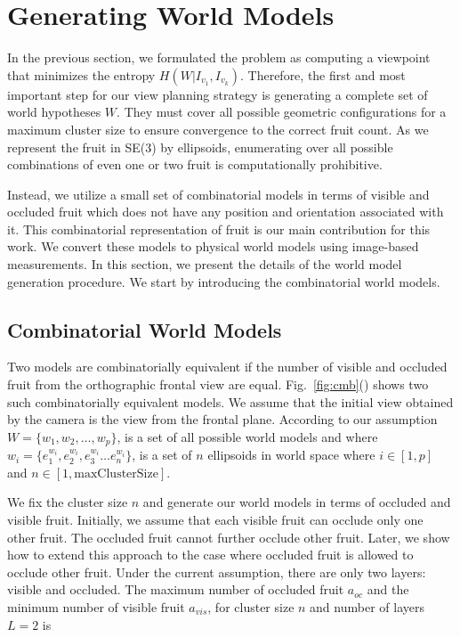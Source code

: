 \section{Generating World Models}\label{sec:models}
In the previous section, we formulated the problem as computing a viewpoint that minimizes the entropy $H(W|I_{v_1},I_{v_k})$. Therefore, the first and most important step for our view planning strategy is generating a complete set of world hypotheses $W$. They must cover all possible geometric configurations for a maximum cluster size to ensure convergence to the correct fruit count. As we represent the fruit in SE(3) by ellipsoids, enumerating over all possible combinations of even one or two fruit is computationally prohibitive.  

Instead, we utilize a small set of combinatorial models in terms of visible and occluded fruit which does not have any position and orientation associated with it. This combinatorial representation of fruit is our main contribution for this work. We convert these models to physical world models using image-based measurements. In this section, we present the details of the world model generation procedure. We start by introducing the combinatorial world models.

\subsection{Combinatorial World Models}\label{subsec:worldmodel}
Two models are combinatorially equivalent if the number of visible and occluded fruit from the orthographic frontal view are equal. Fig.~\ref{fig:cmb}() shows two such combinatorially equivalent models. We assume that the initial view obtained by the camera is the view from the frontal plane. According to our assumption $W = \{w_1,w_2,\ldots,w_p\}$, is a set of all possible world models and  where $w_i = \{ e_1^{w_i}, e_2^{w_i},e_3^{w_i} \ldots e_n^{w_i} \}$, is a set of $n$ ellipsoids in world space where $i \in [1,p]$ and $n \in [1,\text{maxClusterSize}]$. 

We fix the cluster size $n$ and generate our world models in terms of occluded and visible fruit. Initially, we assume that each visible fruit can occlude only one other fruit. The occluded fruit cannot further occlude other fruit. Later, we show how to extend this approach to the case where occluded fruit is allowed to occlude other fruit. Under the current assumption, there are only two layers: visible and occluded. The maximum number of occluded fruit $a_{oc}$ and the minimum number of visible fruit $a_{vis}$, for cluster size $n$ and number of layers $L=2$ is

